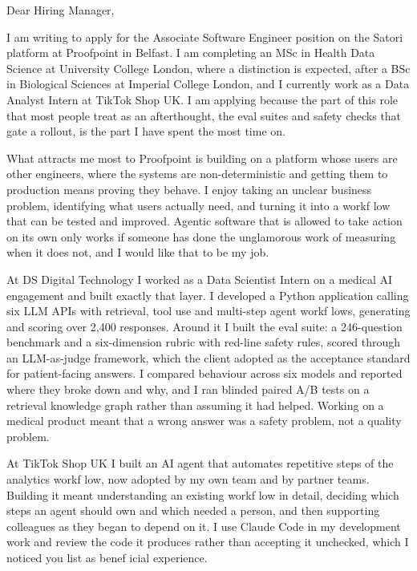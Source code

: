 \documentclass[letterpaper,11pt]{article}
\begin{document}
Dear Hiring Manager,

I am writing to apply for the Associate Software Engineer position on the Satori platform at Proofpoint in Belfast. I am completing an MSc in Health Data Science at University College London, where a distinction is expected, after a BSc in Biological Sciences at Imperial College London, and I currently work as a Data Analyst Intern at TikTok Shop UK. I am applying because the part of this role that most people treat as an afterthought, the eval suites and safety checks that gate a rollout, is the part I have spent the most time on.

What attracts me most to Proofpoint is building on a platform whose users are other engineers, where the systems are non-deterministic and getting them to production means proving they behave. I enjoy taking an unclear business problem, identifying what users actually need, and turning it into a workf\kern0pt low that can be tested and improved. Agentic software that is allowed to take action on its own only works if someone has done the unglamorous work of measuring when it does not, and I would like that to be my job.

At DS Digital Technology I worked as a Data Scientist Intern on a medical AI engagement and built exactly that layer. I developed a Python application calling six LLM APIs with retrieval, tool use and multi-step agent workf\kern0pt lows, generating and scoring over 2,400 responses. Around it I built the eval suite: a 246-question benchmark and a six-dimension rubric with red-line safety rules, scored through an LLM-as-judge framework, which the client adopted as the acceptance standard for patient-facing answers. I compared behaviour across six models and reported where they broke down and why, and I ran blinded paired A/B tests on a retrieval knowledge graph rather than assuming it had helped. Working on a medical product meant that a wrong answer was a safety problem, not a quality problem.

At TikTok Shop UK I built an AI agent that automates repetitive steps of the analytics workf\kern0pt low, now adopted by my own team and by partner teams. Building it meant understanding an existing workf\kern0pt low in detail, deciding which steps an agent should own and which needed a person, and then supporting colleagues as they began to depend on it. I use Claude Code in my development work and review the code it produces rather than accepting it unchecked, which I noticed you list as benef\kern0pt icial experience.
\end{document}
